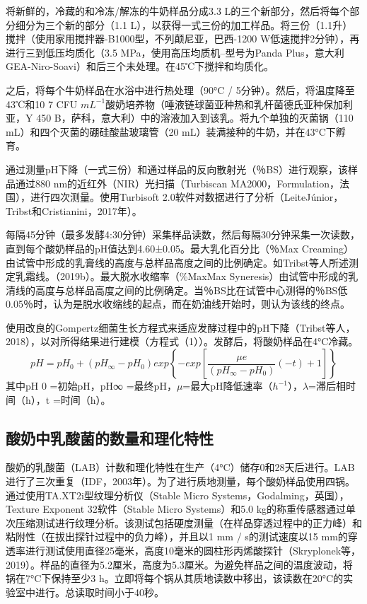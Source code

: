 \documentclass[twocolumn]{ctexart}
\begin{document}
将新鲜的，冷藏的和冷冻/解冻的牛奶样品分成3.3 L的三个新部分，然后将每个部分细分为三个新的部分（1.1 L），以获得一式三份的加工样品。将三份（1.1升）搅拌（使用家用搅拌器-B1000型，不列颠尼亚，巴西-1200 W低速搅拌2分钟），再进行三到低压均质化（3.5 MPa，使用高压均质机–型号为Panda Plus，意大利GEA-Niro-Soavi）和后三个未处理。在45℃下搅拌和均质化。

之后，将每个牛奶样品在水浴中进行热处理（90°C / 5分钟）。然后，将温度降至43℃和10 7  CFU $mL^{-1}$酸奶培养物（唾液链球菌亚种热和乳杆菌德氏亚种保加利亚，Y 450 B，萨科，意大利）中的溶液加入到该乳。将九个单独的灭菌锅（110 mL）和四个灭菌的硼硅酸盐玻璃管（20 mL）装满接种的牛奶，并在43°C下孵育。

通过测量pH下降（一式三份）和通过样品的反向散射光（％BS）进行观察，该样品通过880 nm的近红外（NIR）光扫描（Turbiscan MA2000，Formulation，法国），进行四次测量。使用Turbisoft 2.0软件对数据进行了分析（LeiteJúnior，Tribst和Cristianini，2017年）。

每隔45分钟（最多发酵4:30分钟）采集样品读数，然后每隔30分钟采集一次读数，直到每个酸奶样品的pH值达到4.60±0.05。最大乳化百分比（％Max Creaming）由试管中形成的乳膏线的高度与总样品高度之间的比例确定。如Tribst等人所述测定乳霜线。（2019b）。最大脱水收缩率（\%MaxMax Syneresis）由试管中形成的乳清线的高度与总样品高度之间的比例确定。当％BS比在试管中心测得的％BS低0.05％时，认为是脱水收缩线的起点，而在奶油线开始时，则认为该线的终点。

使用改良的Gompertz细菌生长方程式来适应发酵过程中的pH下降（Tribst等人，2018），以对所得结果进行建模（方程式（1））。发酵后，将酸奶样品在4°C冷藏。
\begin{equation}
		pH = pH_0 + (pH_\infty - pH_0) exp \left \{ -exp \left [ \frac{\mu e}{(pH_\infty - pH_0)} (-t) + 1 \right ] \right \}
\end{equation}
其中pH 0  =初始pH，pH∞  =最终pH，$\mu$=最大pH降低速率（$h^{-1}$），$\lambda$=滞后相时间（h），t =时间（h）。

\subsection{酸奶中乳酸菌的数量和理化特性}
酸奶的乳酸菌（LAB）计数和理化特性在生产（4°C）储存0和28天后进行。LAB进行了三次重复（IDF，2003年）。为了进行质地测量，每个酸奶样品使用四锅。通过使用TA.XT2i型纹理分析仪（Stable Micro Systems，Godalming，英国），Texture Exponent 32软件（Stable Micro Systems）和5.0 kg的称重传感器通过单次压缩测试进行纹理分析。该测试包括硬度测量（在样品穿透过程中的正力峰）和粘附性（在拔出探针过程中的负力峰），并且以1 mm / s的测试速度以15 mm的穿透率进行测试使用直径25毫米，高度10毫米的圆柱形丙烯酸探针（Skryplonek等，2019）。样品的直径为5.2厘米，高度为5.3厘米。为避免样品之间的温度波动，将锅在7°C下保持至少3 h。立即将每个锅从其质地读数中移出，该读数在20°C的实验室中进行。总读取时间小于40秒。
\end{document}
